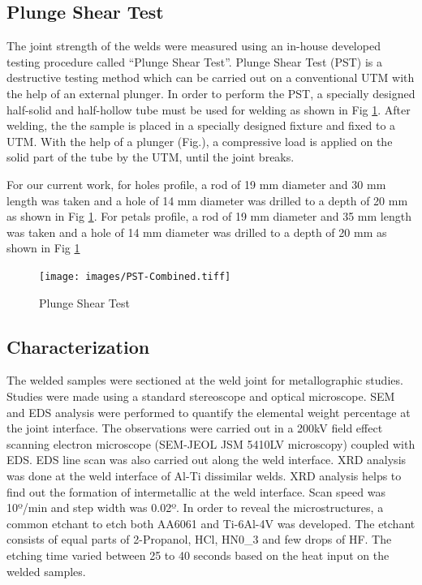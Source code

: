 \documentclass[3p]{elsarticle}
\begin{document}
\subsection{Plunge Shear Test}
\label{subsec:Plunge Shear Test}
The joint strength of the welds were measured using an in-house developed testing procedure called ``Plunge Shear Test''. Plunge Shear Test (PST) is a destructive testing method which can be carried out on a conventional UTM with the help of an external plunger. In order to perform the PST, a specially designed half-solid and half-hollow tube must be used for welding as shown in Fig \ref{fig:pst-schematic}. After welding, the the sample is placed in a specially designed fixture and fixed to a UTM. With the help of a plunger (Fig.), a compressive load is applied on the solid part of the tube by the UTM, until the joint breaks.
\par
For our current work, for holes profile, a rod of 19 mm diameter and 30 mm length was taken and a hole of 14 mm diameter was drilled to a depth of 20 mm as shown in Fig \ref{fig:pst-schematic}. For petals profile, a rod of 19 mm diameter and 35 mm length was taken and a hole of 14 mm diameter was drilled to a depth of 20 mm as shown in Fig \ref{fig:pst-schematic} 

\begin{figure}[H]
\centering
\texttt{[image: images/PST-Combined.tiff]}
\caption{Plunge Shear Test}
\label{fig:pst-schematic}
\end{figure}

\subsection{Characterization}
\label{subsec:Characterization}
The welded samples were sectioned at the weld joint for metallographic studies. Studies were made using a standard stereoscope and optical microscope. SEM and EDS analysis were performed to quantify the elemental weight percentage at the joint interface. The observations were carried out in a 200kV field effect scanning electron microscope (SEM-JEOL JSM 5410LV microscopy) coupled with EDS. EDS line scan was also carried out along the weld interface. XRD analysis was done at the weld interface of Al-Ti dissimilar welds. XRD analysis helps to find out the formation of intermetallic at the weld interface. Scan speed was 10º/min and step width was 0.02º. In order to reveal the microstructures, a common etchant to etch both AA6061 and Ti-6Al-4V was developed. The etchant consists of equal parts of 2-Propanol, HCl, HN0_{3} and few drops of HF. The etching time varied between 25 to 40 seconds based on the heat input on the welded samples.
\end{document}
